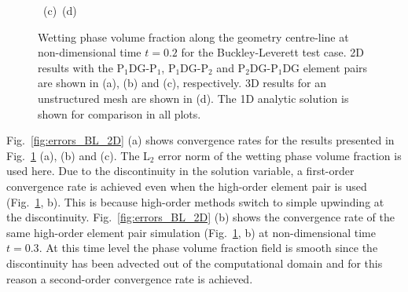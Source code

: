 \documentclass[times]{fldauth}
\newcommand{\PN}[2][error]{P$_{#1}$DG-P$_{#2}$}
\begin{document}
\begin{figure}[h!]
\begin{center}
{      \hbox{
        \vspace{-0.cm}\hbox{\hspace{3.0cm}(c)} 
        \vspace{-0.cm}\hbox{\hspace{6.0cm}(d)}}}
    \caption{Wetting phase volume fraction along the geometry
      centre-line at non-dimensional time $t=0.2$ for the
      Buckley-Leverett test case. 2D results with the \PN[1]{1},
      \PN[1]{2} and \PN[2]{1}DG element pairs are shown in (a), (b)
      and (c), respectively. 3D results for an unstructured mesh are
      shown in (d). The 1D analytic solution is shown for comparison
      in all plots.\label{fig:BL_tests}}
  \end{center}
\end{figure}

Fig.~\ref{fig:errors_BL_2D} (a) shows convergence rates for the
results presented in Fig.~\ref{fig:BL_tests} (a), (b) and (c). The
L$_2$ error norm of the wetting phase volume fraction is used
here. Due to the discontinuity in the solution variable, a
first-order convergence rate is achieved even when the high-order
element pair is used (Fig.~\ref{fig:BL_tests}, b). This is because
high-order methods switch to simple upwinding at the discontinuity.
Fig.~\ref{fig:errors_BL_2D} (b) shows the convergence rate of the same
high-order element pair simulation (Fig.~\ref{fig:BL_tests}, b) at
non-dimensional time $t=0.3$. At this time level the phase volume
fraction field is smooth since the discontinuity has been advected out
of the computational domain and for this reason a second-order
convergence rate is achieved.
\end{document}
